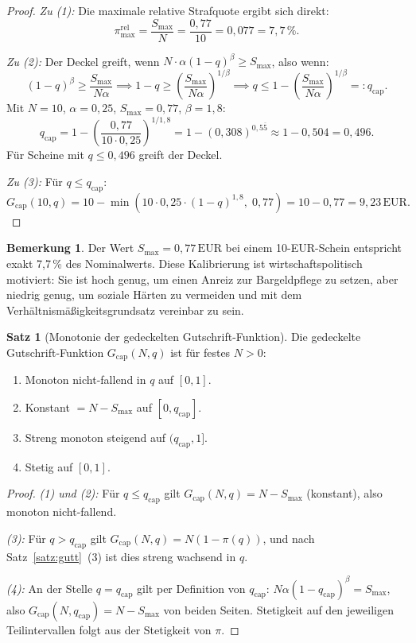 ﻿\documentclass[a4paper,12pt]{article}
\theoremstyle{definition}
\newtheorem{satz}{Satz}
\newtheorem{bemerkung}{Bemerkung}
\begin{document}
\begin{proof}
\emph{Zu (1):} Die maximale relative Strafquote ergibt sich direkt:
\[
\pi_{\max}^{\text{rel}} = \frac{S_{\max}}{N} = \frac{0{,}77}{10} = 0{,}077 = 7{,}7\,\%.
\]

\emph{Zu (2):} Der Deckel greift, wenn $N \cdot \alpha(1-q)^{\beta} \geq S_{\max}$,
also wenn:
\[
(1-q)^{\beta} \geq \frac{S_{\max}}{N\alpha}
\implies
1 - q \geq \left(\frac{S_{\max}}{N\alpha}\right)^{1/\beta}
\implies
q \leq 1 - \left(\frac{S_{\max}}{N\alpha}\right)^{1/\beta} =: q_{\text{cap}}.
\]
Mit $N = 10$, $\alpha = 0{,}25$, $S_{\max} = 0{,}77$, $\beta = 1{,}8$:
\[
q_{\text{cap}} = 1 - \left(\frac{0{,}77}{10 \cdot 0{,}25}\right)^{1/1{,}8}
= 1 - (0{,}308)^{0{,}5\overline{5}}
\approx 1 - 0{,}504 = 0{,}496.
\]
Für Scheine mit $q \leq 0{,}496$ greift der Deckel.

\emph{Zu (3):} Für $q \leq q_{\text{cap}}$:
\[
G_{\text{cap}}(10, q) = 10 - \min(10 \cdot 0{,}25 \cdot (1-q)^{1{,}8},\; 0{,}77)
= 10 - 0{,}77 = 9{,}23\,\text{EUR}.
\]
\end{proof}

\begin{bemerkung}
Der Wert $S_{\max} = 0{,}77\,\text{EUR}$ bei einem 10-EUR-Schein entspricht
exakt 7,7\,\% des Nominalwerts.  Diese Kalibrierung ist wirtschaftspolitisch
motiviert: Sie ist hoch genug, um einen Anreiz zur Bargeldpflege zu setzen,
aber niedrig genug, um soziale Härten zu vermeiden und mit dem
Verhältnismäßigkeitsgrundsatz vereinbar zu sein.
\end{bemerkung}

\begin{satz}[Monotonie der gedeckelten Gutschrift-Funktion]
\label{satz:gcap_mono}
Die gedeckelte Gutschrift-Funktion $G_{\text{cap}}(N, q)$ ist für festes $N > 0$:
\begin{enumerate}
  \item Monoton nicht-fallend in $q$ auf $[0,1]$.
  \item Konstant $= N - S_{\max}$ auf $[0, q_{\text{cap}}]$.
  \item Streng monoton steigend auf $(q_{\text{cap}}, 1]$.
  \item Stetig auf $[0,1]$.
\end{enumerate}
\end{satz}

\begin{proof}
\emph{(1) und (2):} Für $q \leq q_{\text{cap}}$ gilt $G_{\text{cap}}(N,q) = N - S_{\max}$
(konstant), also monoton nicht-fallend.

\emph{(3):} Für $q > q_{\text{cap}}$ gilt $G_{\text{cap}}(N,q) = N(1-\pi(q))$,
und nach Satz~\ref{satz:gutt}~(3) ist dies streng wachsend in $q$.

\emph{(4):} An der Stelle $q = q_{\text{cap}}$ gilt per Definition von $q_{\text{cap}}$:
$N\alpha(1-q_{\text{cap}})^{\beta} = S_{\max}$, also
$G_{\text{cap}}(N, q_{\text{cap}}) = N - S_{\max}$ von beiden Seiten.
Stetigkeit auf den jeweiligen Teilintervallen folgt aus der Stetigkeit von $\pi$.
\end{proof}
\end{document}

